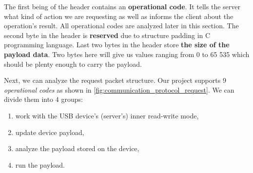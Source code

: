The first being of the header contains an \textbf{operational code}. It tells the server what kind of action we are requesting as well as informs the client about the operation's result. All operational codes are analyzed later in this section. The second byte in the header is \textbf{reserved} due to structure padding in C programming language. 
Last two bytes in the header store \textbf{the size of the payload data}. Two bytes here will give us values ranging from 0 to 65 535 which should be plenty enough to carry the payload.

Next, we can analyze the request packet structure. Our project supports 9 \emph{operational codes} as shown in \autoref{fig:communication_protocol_request}. We can divide them into 4 groups:

\begin{enumerate}
    \item work with the USB device's (server's) inner read-write mode,
    \item update device payload,
    \item analyze the payload stored on the device,
    \item run the payload.
\end{enumerate}

